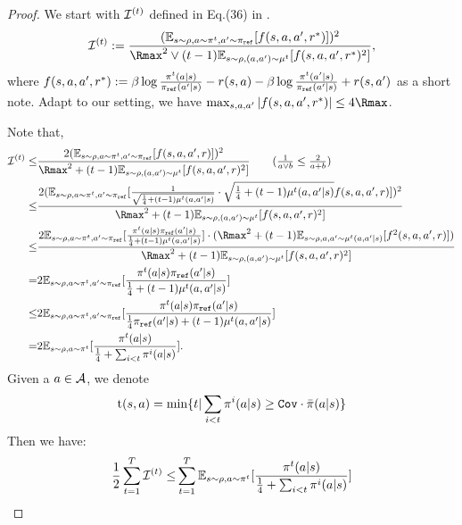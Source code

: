 \iffalse

\begin{proof}
    We start with $\mathcal{I}^{(t)}$ defined in Eq.(36) in \citep{xie2024exploratory}.
    \begin{align*}
        \cI^{(t)} := \frac{(\EE_{s\sim\rho, a\sim\pi^t, a'\sim\pi_\textref}[f(s,a,a',r^*)])^2}{{\Rmax}^2 \vee (t-1) \EE_{s\sim\rho, (a, a')\sim\mu^t}[f(s,a,a',r^*)^2]},
    \end{align*}
    where $f(s,a,a',r^*) := \beta\log\frac{\pi^t(a|s)}{\pi_{\texttt{ref}}(a'|s)} - r(s,a) - \beta\log\frac{\pi^t(a'|s)}{\pi_{\texttt{ref}}(a'|s)} + r(s,a')$ as a short note.
    Adapt to our setting, we have $\max_{s,a,a'}|f(s,a,a',r^*)| \leq 4{\Rmax}$.

    Note that,
    \begin{align*}
        \cI^{(t)} \leq & \frac{2(\EE_{s\sim\rho, a\sim\pi^t, a'\sim\pi_\textref}[f(s,a,a',r)])^2}{{\Rmax}^2 + (t-1) \EE_{s\sim\rho, (a, a')\sim\mu^t}[f(s,a,a',r)^2]} \tag{$\frac{1}{a\vee b} \leq \frac{2}{a+b}$}\\
        \leq & \frac{2(\EE_{s\sim\rho, a\sim\pi^t, a'\sim\pi_\textref}[\frac{1}{\sqrt{\frac{1}{4} + (t-1)\mu^t(a,a'|s)}} \cdot \sqrt{\frac{1}{4} + (t-1)\mu^t(a,a'|s)} f(s,a,a',r)])^2}{{\Rmax}^2 + (t-1) \EE_{s\sim\rho, (a, a')\sim\mu^t}[f(s,a,a',r)^2]} \\
        \leq & \frac{2\EE_{s\sim\rho, a\sim\pi^t, a'\sim\pi_\textref}[\frac{\pi^t(a|s)\pi_\textref(a'|s)}{\frac{1}{4} + (t-1)\mu^t(a,a'|s)}] \cdot ({\Rmax}^2 + (t-1) \EE_{s\sim\rho, a, a'\sim\mu^t(a,a'|s)}[f^2(s,a,a',r)])}{{\Rmax}^2 + (t-1) \EE_{s\sim\rho, (a, a')\sim\mu^t}[f(s,a,a',r)^2]} \\
        = & 2\EE_{s\sim\rho, a\sim\pi^t, a'\sim\pi_\textref}[\frac{\pi^t(a|s)\pi_\textref(a'|s)}{\frac{1}{4} + (t-1)\mu^t(a,a'|s)}] \\
        \leq & 2\EE_{s\sim\rho, a\sim\pi^t, a'\sim\pi_\textref}[\frac{\pi^t(a|s)\pi_\textref(a'|s)}{\frac{1}{4}\pi_\textref(a'|s) + (t-1)\mu^t(a,a'|s)}] \\
        = & 2\EE_{s\sim\rho, a\sim\pi^t}[\frac{\pi^t(a|s)}{\frac{1}{4} + \sum_{i<t}\pi^i(a|s)}].
    \end{align*}
    Given a $a\in\mathcal{A}$, we denote 
    $$
        \text{t}(s,a) = \min\{t|\sum_{i<t}\pi^i(a|s) \geq {\texttt{Cov}} \cdot \bar{\pi}(a|s)\}
    $$
    Then we have:
    \begin{align*}
        \frac{1}{2}\sum_{t=1}^T \cI^{(t)} \leq & \sum_{t=1}^T\EE_{s\sim\rho, a\sim\pi^t}[\frac{\pi^t(a|s)}{\frac{1}{4} + \sum_{i<t}\pi^i(a|s)}] \\

\end{align*}
\end{proof}
